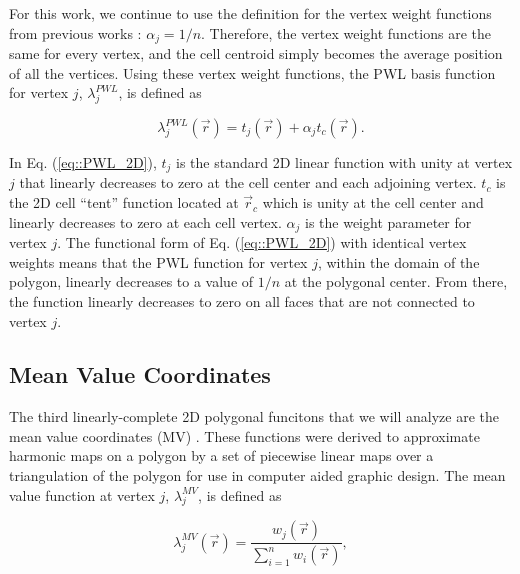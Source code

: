 \documentclass[preprint,10pt]{elsarticle}
\begin{document}
\noindent For this work, we continue to use the definition for the vertex weight functions from previous works \cite{ref::PWLD_stone_adams,ref::PWLD_stone_adams_unstructured,bailey2008phd}: $\alpha_{j}= 1/n$. Therefore, the vertex weight functions are the same for every vertex, and the cell centroid simply becomes the average position of all the vertices. Using these vertex weight functions, the PWL basis function for vertex $j$, $\lambda_j^{PWL}$, is defined as

\begin{equation}
\label{eq::PWL_2D}
\lambda_j^{PWL} (\vec{r}) = t_j (\vec{r}) + \alpha_j t_c (\vec{r}) .
\end{equation}

\noindent In Eq. (\ref{eq::PWL_2D}), $t_j$ is the standard 2D linear function with unity at vertex $j$ that linearly decreases to zero at the cell center and each adjoining vertex. $t_c$ is the 2D cell ``tent'' function located at $\vec{r}_{c}$ which is unity at the cell center and linearly decreases to zero at each cell vertex. $\alpha_{j}$ is the weight parameter for vertex $j$. The functional form of Eq. (\ref{eq::PWL_2D}) with identical vertex weights means that the PWL function for vertex $j$, within the domain of the polygon, linearly decreases to a value of $1/n$ at the polygonal center. From there, the function linearly decreases to zero on all faces that are not connected to vertex $j$.

\subsection{Mean Value Coordinates}

The third linearly-complete 2D polygonal funcitons that we will analyze are the mean value coordinates (MV) \cite{floater2003mean,floater2015generalized}. These functions were derived to approximate harmonic maps on a polygon by a set of piecewise linear maps over a triangulation of the polygon for use in computer aided graphic design. The mean value function at vertex $j$, $\lambda_{j}^{MV}$, is defined as

\begin{equation}
\label{eq::MV_BF}
\lambda_{j}^{MV} (\vec{r}) = \frac{w_j (\vec{r}) }{\sum\limits_{i=1}^{n} w_i (\vec{r})} ,
\end{equation}
\end{document}
